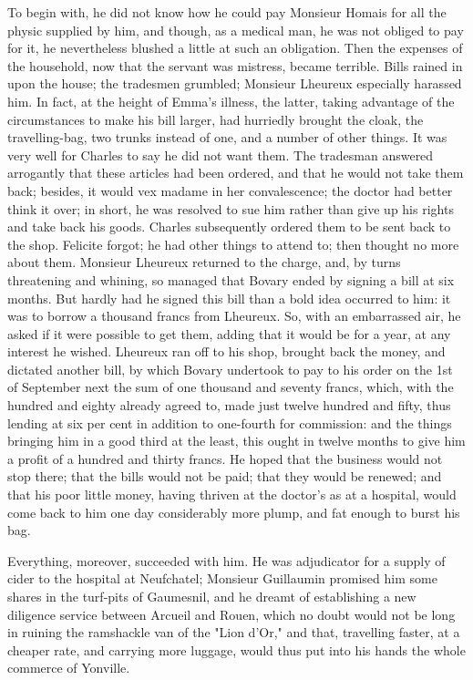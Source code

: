 \documentclass[11pt,twocolumn]{ltugboat}
\begin{document}
To begin with, he did not know how he could pay Monsieur Homais for all
the physic supplied by him, and though, as a medical man, he was not
obliged to pay for it, he nevertheless blushed a little at such an
obligation. Then the expenses of the household, now that the servant was
mistress, became terrible. Bills rained in upon the house; the tradesmen
grumbled; Monsieur Lheureux especially harassed him. In fact, at
the height of Emma's illness, the latter, taking advantage of the
circumstances to make his bill larger, had hurriedly brought the cloak,
the travelling-bag, two trunks instead of one, and a number of other
things. It was very well for Charles to say he did not want them. The
tradesman answered arrogantly that these articles had been ordered, and
that he would not take them back; besides, it would vex madame in her
convalescence; the doctor had better think it over; in short, he was
resolved to sue him rather than give up his rights and take back his
goods. Charles subsequently ordered them to be sent back to the shop.
Felicite forgot; he had other things to attend to; then thought no more
about them. Monsieur Lheureux returned to the charge, and, by turns
threatening and whining, so managed that Bovary ended by signing a
bill at six months. But hardly had he signed this bill than a bold idea
occurred to him: it was to borrow a thousand francs from Lheureux.
So, with an embarrassed air, he asked if it were possible to get them,
adding that it would be for a year, at any interest he wished. Lheureux
ran off to his shop, brought back the money, and dictated another bill,
by which Bovary undertook to pay to his order on the 1st of September
next the sum of one thousand and seventy francs, which, with the hundred
and eighty already agreed to, made just twelve hundred and fifty, thus
lending at six per cent in addition to one-fourth for commission: and
the things bringing him in a good third at the least, this ought in
twelve months to give him a profit of a hundred and thirty francs. He
hoped that the business would not stop there; that the bills would not
be paid; that they would be renewed; and that his poor little money,
having thriven at the doctor's as at a hospital, would come back to him
one day considerably more plump, and fat enough to burst his bag.

Everything, moreover, succeeded with him. He was adjudicator for a
supply of cider to the hospital at Neufchatel; Monsieur Guillaumin
promised him some shares in the turf-pits of Gaumesnil, and he dreamt of
establishing a new diligence service between Arcueil and Rouen, which
no doubt would not be long in ruining the ramshackle van of the "Lion
d'Or," and that, travelling faster, at a cheaper rate, and carrying more
luggage, would thus put into his hands the whole commerce of Yonville.
\end{document}
